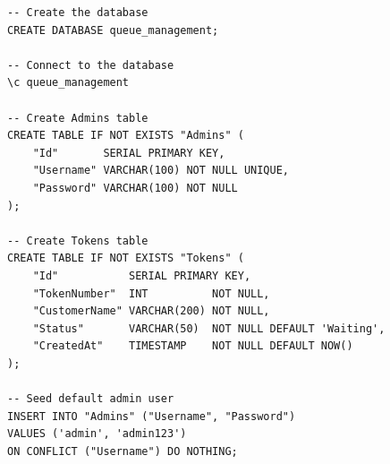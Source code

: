 \begin{verbatim}
-- Create the database
CREATE DATABASE queue_management;

-- Connect to the database
\c queue_management

-- Create Admins table
CREATE TABLE IF NOT EXISTS "Admins" (
    "Id"       SERIAL PRIMARY KEY,
    "Username" VARCHAR(100) NOT NULL UNIQUE,
    "Password" VARCHAR(100) NOT NULL
);

-- Create Tokens table
CREATE TABLE IF NOT EXISTS "Tokens" (
    "Id"           SERIAL PRIMARY KEY,
    "TokenNumber"  INT          NOT NULL,
    "CustomerName" VARCHAR(200) NOT NULL,
    "Status"       VARCHAR(50)  NOT NULL DEFAULT 'Waiting',
    "CreatedAt"    TIMESTAMP    NOT NULL DEFAULT NOW()
);

-- Seed default admin user
INSERT INTO "Admins" ("Username", "Password")
VALUES ('admin', 'admin123')
ON CONFLICT ("Username") DO NOTHING;
\end{verbatim}
